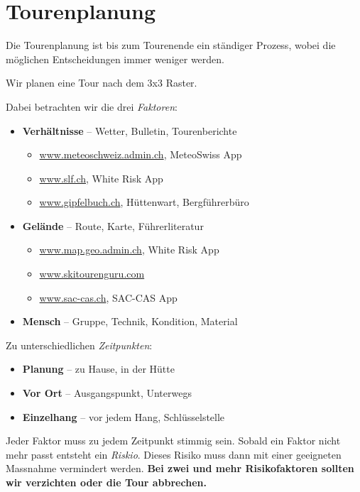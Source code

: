 \section{Tourenplanung}

Die Tourenplanung ist bis zum Tourenende ein ständiger Prozess, wobei die möglichen Entscheidungen immer weniger werden.

Wir planen eine Tour nach dem 3x3 Raster.

Dabei betrachten wir die drei \textit{Faktoren}:

\begin{itemize}
  \item{
    \textbf{Verhältnisse} -- Wetter, Bulletin, Tourenberichte
    \begin{itemize}
      \item{\href{https://www.meteoschweiz.admin.ch/}{www.meteoschweiz.admin.ch}, MeteoSwiss App}
      \item{\href{https://www.slf.ch/}{www.slf.ch}, White Risk App}
      \item{\href{https://www.gipfelbuch.ch/}{www.gipfelbuch.ch}, Hüttenwart, Bergführerbüro}
    \end{itemize}
  }
  \item{\textbf{Gelände} -- Route, Karte, Führerliteratur
    \begin{itemize}
      \item{\href{https://s.geo.admin.ch/y34y7btkqsvz}{www.map.geo.admin.ch}, White Risk App}
      \item{\href{https://www.skitourenguru.com//}{www.skitourenguru.com}}
      \item{\href{https://www.sac-cas.ch/de/huetten-und-touren/sac-tourenportal/}{www.sac-cas.ch}, SAC-CAS App}
    \end{itemize}
  }
  \item{\textbf{Mensch} -- Gruppe, Technik, Kondition, Material}
\end{itemize}

Zu unterschiedlichen \textit{Zeitpunkten}:

\begin{itemize}
  \item{\textbf{Planung} -- zu Hause, in der Hütte}
  \item{\textbf{Vor Ort} -- Ausgangspunkt, Unterwegs}
  \item{\textbf{Einzelhang} -- vor jedem Hang, Schlüsselstelle}
\end{itemize}

Jeder Faktor muss zu jedem Zeitpunkt stimmig sein.
Sobald ein Faktor nicht mehr passt entsteht ein \textit{Riskio}.
Dieses Risiko muss dann mit einer geeigneten Massnahme vermindert werden.
\textbf{Bei zwei und mehr Risikofaktoren sollten wir verzichten oder die Tour abbrechen.}

